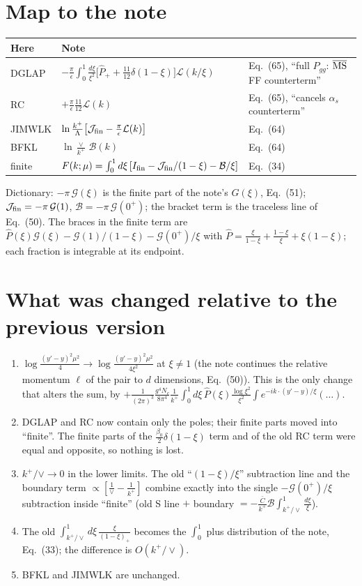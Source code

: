 \documentclass[10pt]{article}
\begin{document}
\section*{Map to the note}
\begin{tabular}{lll}
\hline
Here & Note & \\ \hline
DGLAP & $-\frac{\pi}{\epsilon}\int_0^1\frac{d\xi}{\xi^2}\big[\hat P_+ +\frac{11}{12}\delta(1-\xi)\big]\mathcal L(k/\xi)$ & Eq.~(65), ``full $P_{gg}$: $\overline{\rm MS}$ FF counterterm''\\
RC & $+\frac{\pi}{\epsilon}\frac{11}{12}\mathcal L(k)$ & Eq.~(65), ``cancels $\alpha_s$ counterterm''\\
JIMWLK & $\ln\frac{k^+}{\Lambda}\big[\mathcal J_{\rm fin}-\frac{\pi}{\epsilon}\mathcal L(k)\big]$ & Eq.~(64)\\
BFKL & $\ln\frac{\vee}{k^+}\,\mathcal B(k)$ & Eq.~(64)\\
finite & $F(k;\mu)=\int_0^1d\xi\,[I_{\rm fin}-\mathcal J_{\rm fin}/(1-\xi)-\mathcal B/\xi]$ & Eq.~(34)\\ \hline
\end{tabular}

Dictionary: $-\pi\,\mathcal G(\xi)$ is the finite part of the note's $G(\xi)$, Eq.~(51);
$\mathcal J_{\rm fin}=-\pi\,\mathcal G(1)$, $\mathcal B=-\pi\,\mathcal G(0^+)$; the bracket term is the traceless line of Eq.~(50).
The braces in the finite term are $\hat P(\xi)\mathcal G(\xi)-\mathcal G(1)/(1-\xi)-\mathcal G(0^+)/\xi$
with $\hat P=\frac{\xi}{1-\xi}+\frac{1-\xi}{\xi}+\xi(1-\xi)$; each fraction is integrable at its endpoint.

\section*{What was changed relative to the previous version}
\begin{enumerate}
\item $\log\frac{(y'-y)^2\mu^2}{4}\to\log\frac{(y'-y)^2\mu^2}{4\xi^2}$ at $\xi\neq1$ (the note continues the
relative momentum $\ell$ of the pair to $d$ dimensions, Eq.~(50)). This is the only change that alters
the sum, by $+\frac{1}{(2\pi)^3}\frac{g^4N_c}{8\pi^4}\frac{1}{k^+}\int_0^1d\xi\,\hat P(\xi)\frac{\log\xi^2}{\xi^2}\int e^{-ik\cdot(y'-y)/\xi}(\dots)$.
\item DGLAP and RC now contain only the poles; their finite parts moved into ``finite''. The finite
parts of the $\frac{\beta_0}{2}\delta(1-\xi)$ term and of the old RC term were equal and opposite, so
nothing is lost.
\item $k^+/\vee\to0$ in the lower limits. The old ``$(1-\xi)/\xi$'' subtraction line and the boundary term
$\propto[\frac1\vee-\frac1{k^+}]$ combine exactly into the single $-\mathcal G(0^+)/\xi$ subtraction
inside ``finite'' (old S line $+$ boundary $=-\frac{\bar C}{k^+}\mathcal B\int_{k^+/\vee}^1\frac{d\xi}{\xi}$).
\item The old $\int_{k^+/\vee}^1d\xi\,\frac{\xi}{(1-\xi)_+}$ becomes the $\int_0^1$ plus distribution of the note,
Eq.~(33); the difference is $O(k^+/\vee)$.
\item BFKL and JIMWLK are unchanged.
\end{enumerate}
\end{document}
